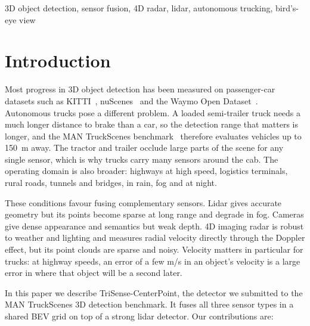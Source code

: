 \documentclass[conference]{IEEEtran}
\newcommand{\method}{TriSense-CenterPoint}
\begin{document}
\begin{IEEEkeywords}
3D object detection, sensor fusion, 4D radar, lidar, autonomous trucking, bird's-eye view
\end{IEEEkeywords}

\section{Introduction}

Most progress in 3D object detection has been measured on passenger-car datasets such as KITTI~\cite{geiger2012kitti},
nuScenes~\cite{caesar2020nuscenes} and the Waymo Open Dataset~\cite{sun2020waymo}. Autonomous trucks pose a
different problem. A loaded semi-trailer truck needs a much longer distance to brake than a car, so the
detection range that matters is longer, and the MAN TruckScenes benchmark~\cite{fent2024truckscenes} therefore
evaluates vehicles up to 150~m away. The tractor and trailer occlude large parts of the scene for any single sensor,
which is why trucks carry many sensors around the cab. The operating domain is also broader: highways at high speed,
logistics terminals, rural roads, tunnels and bridges, in rain, fog and at night.

These conditions favour fusing complementary sensors. Lidar gives accurate geometry but its points become sparse at
long range and degrade in fog. Cameras give dense appearance and semantics but weak depth. 4D imaging radar is robust
to weather and lighting and measures radial velocity directly through the Doppler effect, but its point clouds are
sparse and noisy. Velocity matters in particular for trucks: at highway speeds, an error of a few m/s in an
object's velocity is a large error in where that object will be a second later.

In this paper we describe \method, the detector we submitted to the MAN TruckScenes 3D detection benchmark. It fuses
all three sensor types in a shared BEV grid on top of a strong lidar detector. Our contributions are:
\end{document}
